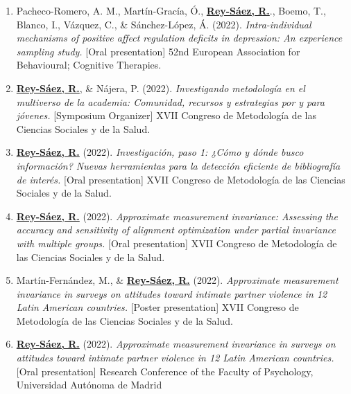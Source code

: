 \documentclass[
  letterpaper,
  DIV=11,
  numbers=noendperiod]{scrartcl}
\begin{document}
\begin{enumerate}
  presentation{]} Emotions Congress 2023.
\item
  Pacheco-Romero, A. M., Martín-Gracía, Ó., \ul{\textbf{Rey-Sáez, R.}}.,
  Boemo, T., Blanco, I., Vázquez, C., \& Sánchez-López, Á. (2022).
  \emph{Intra-individual mechanisms of positive affect regulation
  deficits in depression: An experience sampling study.} {[}Oral
  presentation{]} 52nd European Association for Behavioural; Cognitive
  Therapies.
\item
  \ul{\textbf{Rey-Sáez, R.}}, \& Nájera, P. (2022). \emph{Investigando
  metodología en el multiverso de la academia: Comunidad, recursos y
  estrategias por y para jóvenes.} {[}Symposium Organizer{]} XVII
  Congreso de Metodología de las Ciencias Sociales y de la Salud.
\item
  \ul{\textbf{Rey-Sáez, R.}} (2022). \emph{Investigación, paso 1: ¿Cómo
  y dónde busco información? Nuevas herramientas para la detección
  eficiente de bibliografía de interés.} {[}Oral presentation{]} XVII
  Congreso de Metodología de las Ciencias Sociales y de la Salud.
\item
  \ul{\textbf{Rey-Sáez, R.}} (2022). \emph{Approximate measurement
  invariance: Assessing the accuracy and sensitivity of alignment
  optimization under partial invariance with multiple groups.} {[}Oral
  presentation{]} XVII Congreso de Metodología de las Ciencias Sociales
  y de la Salud.
\item
  Martín-Fernández, M., \& \ul{\textbf{Rey-Sáez, R.}} (2022).
  \emph{Approximate measurement invariance in surveys on attitudes
  toward intimate partner violence in 12 Latin American countries.}
  {[}Poster presentation{]} XVII Congreso de Metodología de las Ciencias
  Sociales y de la Salud.
\item
  \ul{\textbf{Rey-Sáez, R.}} (2022). \emph{Approximate measurement
  invariance in surveys on attitudes toward intimate partner violence in
  12 Latin American countries.} {[}Oral presentation{]} Research
  Conference of the Faculty of Psychology, Universidad Autónoma de
  Madrid
\end{enumerate}
\end{document}

